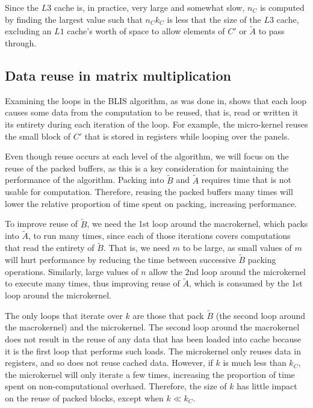 \documentclass[12pt]{article}
\begin{document}
Since the $L3$ cache is, in practice, very large and somewhat slow, $n_C$ is computed by finding the largest value such that $n_Ck_C$ is less that the size of the $L3$ cache, excluding an $L1$ cache's worth of space to allow elements of $C'$ or $\tilde{A}$ to pass through.

\subsection{Data reuse in  matrix multiplication}
Examining the loops in the BLIS algorithm, as was done in\cite{Low2016}, shows that each loop causes some data from the computation to be reused, that is, read or written it its entirety during each iteration of the loop.
For example, the micro-kernel reuses the small block of $C'$ that is stored in registers while looping over the panels.

Even though reuse occurs at each level of the algorithm, we will focus on the reuse of the packed buffers, as this is a key consideration for maintaining the performance of the algorithm\cite{Henry92}.
Packing into $\tilde{B}$ and $\tilde{A}$ requires time that is not usable for computation.
Therefore, reusing the packed buffers many times will lower the relative proportion of time spent on packing, increasing performance.

To improve reuse of $\tilde{B}$, we need the 1st loop around the macrokernel, which packs into $\tilde{A}$, to run many times, since each of those iterations covers computations that read the entirety of $\tilde{B}$.
That is, we need $m$ to be large, as small values of $m$ will hurt performance by reducing the time between successive $\tilde{B}$ packing operations.
Similarly, large values of $n$ allow the 2nd loop around the microkernel to execute many times, thus improving reuse of $\tilde{A}$, which is consumed by the 1st loop around the microkernel.

The only loops that iterate over $k$ are those that pack $\tilde{B}$ (the second loop around the macrokernel) and the microkernel.
The second loop around the macrokernel does not result in the reuse of any data that has been loaded into cache because it is the first loop that performs such loads.
The microkernel only reuses data in registers, and so does not reuse cached data.
However, if $k$ is much less than $k_C$, the microkernel will only iterate a few times, increasing the proportion of time spent on non-computational overhaed.
Therefore, the size of $k$ has little impact on the reuse of packed blocks, except when $k \ll k_C$.
\end{document}
